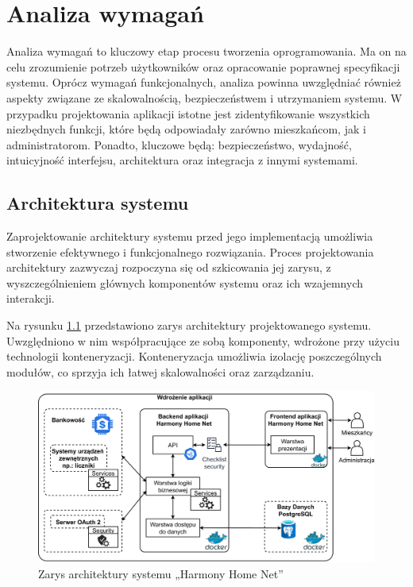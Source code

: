 \chapter{Analiza wymagań}
Analiza wymagań to kluczowy etap procesu tworzenia oprogramowania. Ma on na celu zrozumienie potrzeb użytkowników oraz opracowanie poprawnej specyfikacji systemu. Oprócz wymagań funkcjonalnych, analiza powinna uwzględniać również aspekty związane ze skalowalnością, bezpieczeństwem i utrzymaniem systemu. W przypadku projektowania aplikacji istotne jest zidentyfikowanie wszystkich niezbędnych funkcji, które będą odpowiadały zarówno mieszkańcom, jak i administratorom. Ponadto, kluczowe będą: bezpieczeństwo, wydajność, intuicyjność interfejsu, architektura oraz integracja z innymi systemami.

\section{Architektura systemu} 
Zaprojektowanie architektury systemu przed jego implementacją umożliwia stworzenie efektywnego i funkcjonalnego rozwiązania. Proces projektowania architektury zazwyczaj rozpoczyna się od szkicowania jej zarysu, z wyszczególnieniem głównych komponentów systemu oraz ich wzajemnych interakcji. 

Na rysunku \ref{fig:zarys_architektury} przedstawiono zarys architektury projektowanego systemu. Uwzględniono w nim współpracujące ze sobą komponenty, wdrożone przy użyciu technologii konteneryzacji. Konteneryzacja umożliwia izolację poszczególnych modułów, co sprzyja ich łatwej skalowalności oraz zarządzaniu.
\begin{figure}[ht]
    \centering
    \includegraphics[width=.9\linewidth]{rys02/zarys_architektury}
    \caption{Zarys architektury systemu „Harmony Home Net”}
    \label{fig:zarys_architektury}
\end{figure}

